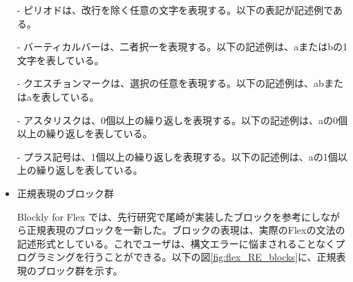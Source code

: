 \documentclass{risepaper}
\begin{document}
\begin{itemize}
\shadowbox{
\begin{minipage}[t]{3cm}
\begin{verbatim}
[^0-9]
\end{verbatim}
\end{minipage}
}

- ピリオドは、改行を除く任意の文字を表現する。以下の表記が記述例である。


- バーティカルバーは、二者択一を表現する。以下の記述例は、aまたはbの1文字を表している。


- クエスチョンマークは、選択の任意を表現する。以下の記述例は、abまたはaを表している。


- アスタリスクは、0個以上の繰り返しを表現する。以下の記述例は、aの0個以上の繰り返しを表している。


- プラス記号は、1個以上の繰り返しを表現する。以下の記述例は、aの1個以上の繰り返しを表している。


\item 正規表現のブロック群

Blockly for Flex では、先行研究で尾崎が実装したブロックを参考にしながら正規表現のブロックを一新した。ブロックの表現は、実際のFlexの文法の記述形式としている。これでユーザは、構文エラーに悩まされることなくプログラミングを行うことができる。以下の図\ref{fig:flex_RE_blocks}に、正規表現のブロック群を示す。


\end{itemize}
\end{document}
